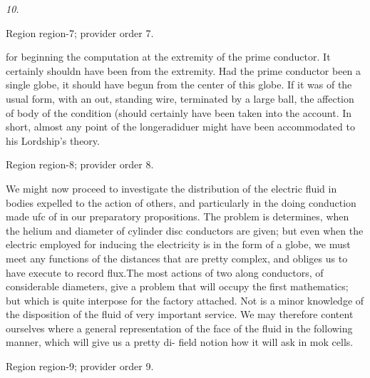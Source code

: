 \documentclass[11pt]{article}
\begin{document}
{\small\itshape 10.\par}

{\scriptsize\color{gray} Region region-7; provider order 7.\par}
\medskip

for beginning the computation at the extremity of the prime conductor. It certainly shouldn have been from the extremity. Had the prime conductor been a single globe, it should have begun from the center of this globe. If it was of the usual form, with an out, standing wire, terminated by a large ball, the affection of body of the condition (should certainly have been taken into the account. In short, almost any point of the longeradiduer might have been accommodated to his Lordship's theory.
\par

{\scriptsize\color{gray} Region region-8; provider order 8.\par}
\medskip

We might now proceed to investigate the distribution of the electric fluid in bodies expelled to the action of others, and particularly in the doing conduction made ufc of in our preparatory propositions. The problem is determines, when the helium and diameter of cylinder disc conductors are given; but even when the electric employed for inducing the electricity is in the form of a globe, we must meet any functions of the distances that are pretty complex, and obliges us to have execute to record flux.The most actions of two along conductors, of considerable diameters, give a problem that will occupy the first mathematics; but which is quite interpose for the factory attached. Not is a minor knowledge of the disposition of the fluid of very important service. We may therefore content ourselves where a general representation of the face of the fluid in the following manner, which will give us a pretty di- field notion how it will ask in mok cells.
\par

{\scriptsize\color{gray} Region region-9; provider order 9.\par}
\medskip
\end{document}

